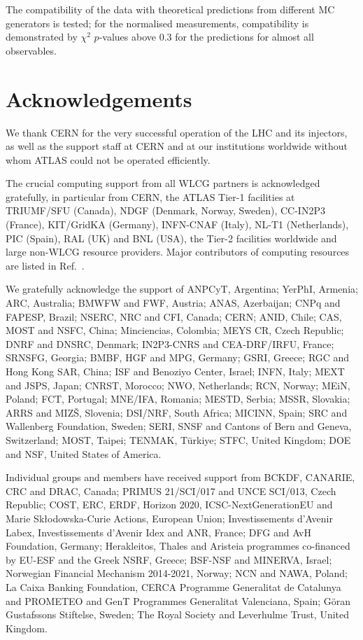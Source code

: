 \documentclass[cernpreprint, atlasdraft=false, texlive=2023, UKenglish, texmf, orcidlogo]{atlasdoc}
\begin{document}
The compatibility of the data with theoretical predictions from different
MC generators is tested; for the normalised \xs measurements, compatibility is
demonstrated by $\chi^2$ $p$-values above 0.3 for the \Sherpa predictions
for almost all observables.
 
 
 
 


 
\section*{Acknowledgements}
 

 
 
We thank CERN for the very successful operation of the LHC and its injectors, as well as the support staff at
CERN and at our institutions worldwide without whom ATLAS could not be operated efficiently.
 
The crucial computing support from all WLCG partners is acknowledged gratefully, in particular from CERN, the ATLAS Tier-1 facilities at TRIUMF/SFU (Canada), NDGF (Denmark, Norway, Sweden), CC-IN2P3 (France), KIT/GridKA (Germany), INFN-CNAF (Italy), NL-T1 (Netherlands), PIC (Spain), RAL (UK) and BNL (USA), the Tier-2 facilities worldwide and large non-WLCG resource providers. Major contributors of computing resources are listed in Ref.~\cite{ATL-SOFT-PUB-2023-001}.
 
We gratefully acknowledge the support of ANPCyT, Argentina; YerPhI, Armenia; ARC, Australia; BMWFW and FWF, Austria; ANAS, Azerbaijan; CNPq and FAPESP, Brazil; NSERC, NRC and CFI, Canada; CERN; ANID, Chile; CAS, MOST and NSFC, China; Minciencias, Colombia; MEYS CR, Czech Republic; DNRF and DNSRC, Denmark; IN2P3-CNRS and CEA-DRF/IRFU, France; SRNSFG, Georgia; BMBF, HGF and MPG, Germany; GSRI, Greece; RGC and Hong Kong SAR, China; ISF and Benoziyo Center, Israel; INFN, Italy; MEXT and JSPS, Japan; CNRST, Morocco; NWO, Netherlands; RCN, Norway; MEiN, Poland; FCT, Portugal; MNE/IFA, Romania; MESTD, Serbia; MSSR, Slovakia; ARRS and MIZ\v{S}, Slovenia; DSI/NRF, South Africa; MICINN, Spain; SRC and Wallenberg Foundation, Sweden; SERI, SNSF and Cantons of Bern and Geneva, Switzerland; MOST, Taipei; TENMAK, T\"urkiye; STFC, United Kingdom; DOE and NSF, United States of America.
 
Individual groups and members have received support from BCKDF, CANARIE, CRC and DRAC, Canada; PRIMUS 21/SCI/017 and UNCE SCI/013, Czech Republic; COST, ERC, ERDF, Horizon 2020, ICSC-NextGenerationEU and Marie Sk{\l}odowska-Curie Actions, European Union; Investissements d'Avenir Labex, Investissements d'Avenir Idex and ANR, France; DFG and AvH Foundation, Germany; Herakleitos, Thales and Aristeia programmes co-financed by EU-ESF and the Greek NSRF, Greece; BSF-NSF and MINERVA, Israel; Norwegian Financial Mechanism 2014-2021, Norway; NCN and NAWA, Poland; La Caixa Banking Foundation, CERCA Programme Generalitat de Catalunya and PROMETEO and GenT Programmes Generalitat Valenciana, Spain; G\"{o}ran Gustafssons Stiftelse, Sweden; The Royal Society and Leverhulme Trust, United Kingdom.
 
\end{document}

